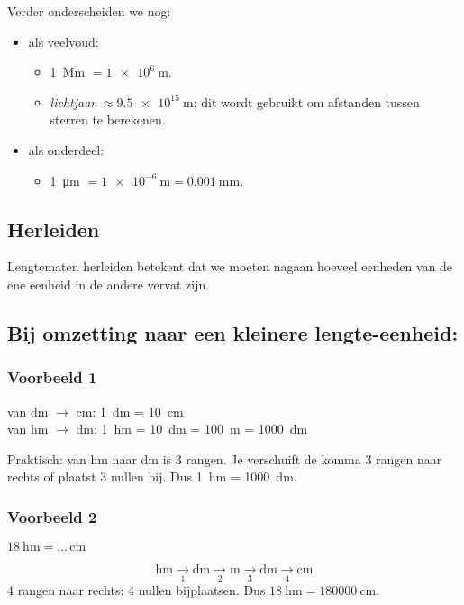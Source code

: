 \documentclass[a4paper,12pt]{article}
\begin{document}
Verder onderscheiden we nog:
\begin{itemize}
\item als veelvoud:
  \begin{itemize}
  \item \SI{1}{\mega\metre} $= \SI{1e6}{\metre}$.
  \item \emph{lichtjaar} $\approx \SI{9.5e15}{\metre}$; dit wordt gebruikt om afstanden tussen sterren te berekenen.
  \end{itemize}
\item als onderdeel:
  \begin{itemize}
  \item \SI{1}{\micro\metre} $= \SI{1e-6}{\metre} = \SI{0.001}{\milli\metre}$.
  \end{itemize}
\end{itemize}

\subsection{Herleiden}
Lengtematen herleiden betekent dat we moeten nagaan hoeveel eenheden van de ene eenheid in de andere vervat zijn.

\subsection*{Bij omzetting naar een kleinere lengte-eenheid:}

\subsubsection*{Voorbeeld 1}
van \si{\deci\metre} $\to$ \si{\centi\metre}: \quad \SI{1}{\deci\metre} = \SI{10}{\centi\metre}\\[0.4em]
van \si{\hecto\metre} $\to$ \si{\deci\metre}: \quad \SI{1}{\hecto\metre} = \SI{10}{\deca\metre} = \SI{100}{\metre} = \SI{1000}{\deci\metre}

Praktisch: van \si{\hecto\metre} naar \si{\deci\metre} is 3 rangen. Je verschuift de komma 3 rangen naar rechts of plaatst 3 nullen bij. Dus \SI{1}{\hecto\metre} = \SI{1000}{\deci\metre}.

\subsubsection*{Voorbeeld 2}
\(\SI{18}{\hecto\metre}=\ldots\,\si{\centi\metre}\)

\[
  \si{\hecto\metre}\xrightarrow[1]{}\si{\deca\metre}\xrightarrow[2]{}\si{\metre}\xrightarrow[3]{}\si{\deci\metre}\xrightarrow[4]{}\si{\centi\metre}
\]
4 rangen naar rechts: 4 nullen bijplaatsen. Dus \(\SI{18}{\hecto\metre}=\SI{180000}{\centi\metre}\).
\end{document}
